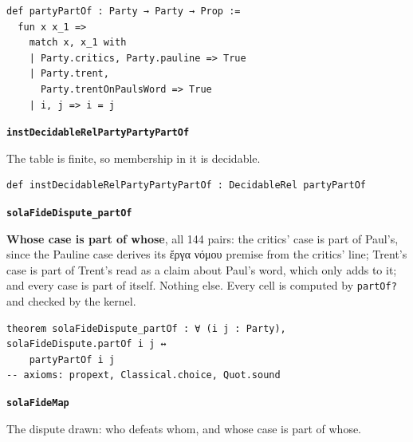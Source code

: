 \documentclass[11pt]{article}
\begin{document}
{\small\begin{verbatim}
def partyPartOf : Party → Party → Prop :=
  fun x x_1 =>
    match x, x_1 with
    | Party.critics, Party.pauline => True
    | Party.trent,
      Party.trentOnPaulsWord => True
    | i, j => i = j
\end{verbatim}}
\par\medskip\noindent\textbf{\texttt{inst\allowbreak{}Decidable\allowbreak{}Rel\allowbreak{}Party\allowbreak{}Party\allowbreak{}Part\allowbreak{}Of}}\par\nobreak\noindent
The table is finite, so membership in it is decidable.

{\small\begin{verbatim}
def instDecidableRelPartyPartyPartOf : DecidableRel partyPartOf
\end{verbatim}}
\par\medskip\noindent\textbf{\texttt{sola\allowbreak{}Fide\allowbreak{}Dispute\_\allowbreak{}part\allowbreak{}Of}}\par\nobreak\noindent
\textbf{Whose case is part of whose}, all 144 pairs: the critics' case is part of Paul's, since the Pauline case derives its ἔργα νόμου premise from the critics' line; Trent's case is part of Trent's read as a claim about Paul's word, which only adds to it; and every case is part of itself. Nothing else. Every cell is computed by \texttt{part\allowbreak{}Of?} and checked by the kernel.

{\small\begin{verbatim}
theorem solaFideDispute_partOf : ∀ (i j : Party), solaFideDispute.partOf i j ↔
    partyPartOf i j
-- axioms: propext, Classical.choice, Quot.sound
\end{verbatim}}
\par\medskip\noindent\textbf{\texttt{sola\allowbreak{}Fide\allowbreak{}Map}}\par\nobreak\noindent
The dispute drawn: who defeats whom, and whose case is part of whose.
\end{document}
